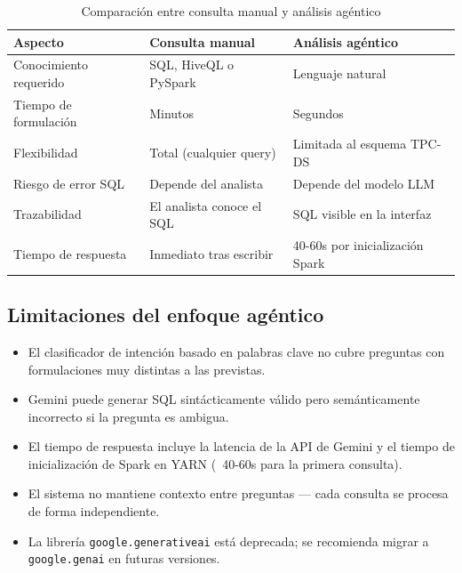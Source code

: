 \begin{table}[H]
    \centering
    \caption{Comparación entre consulta manual y análisis agéntico}
    \label{tab:manual_vs_agéntico}
    \begin{tabularx}{\textwidth}{l X X}
        \toprule
        \textbf{Aspecto} & \textbf{Consulta manual} & \textbf{Análisis agéntico} \\
        \midrule
        Conocimiento requerido  & SQL, HiveQL o PySpark    & Lenguaje natural \\
        Tiempo de formulación   & Minutos                  & Segundos \\
        Flexibilidad            & Total (cualquier query)  & Limitada al esquema TPC-DS \\
        Riesgo de error SQL     & Depende del analista     & Depende del modelo LLM \\
        Trazabilidad            & El analista conoce el SQL & SQL visible en la interfaz \\
        Tiempo de respuesta     & Inmediato tras escribir  & 40-60s por inicialización Spark \\
        \bottomrule
    \end{tabularx}
\end{table}

\subsection{Limitaciones del enfoque agéntico}

\begin{itemize}[noitemsep]
    \item El clasificador de intención basado en palabras clave no cubre preguntas
          con formulaciones muy distintas a las previstas.
    \item Gemini puede generar SQL sintácticamente válido pero semánticamente incorrecto
          si la pregunta es ambigua.
    \item El tiempo de respuesta incluye la latencia de la API de Gemini y el tiempo
          de inicialización de Spark en YARN (~40-60s para la primera consulta).
    \item El sistema no mantiene contexto entre preguntas — cada consulta se procesa
          de forma independiente.
    \item La librería \texttt{google.generativeai} está deprecada; se recomienda migrar
          a \texttt{google.genai} en futuras versiones.
\end{itemize}
